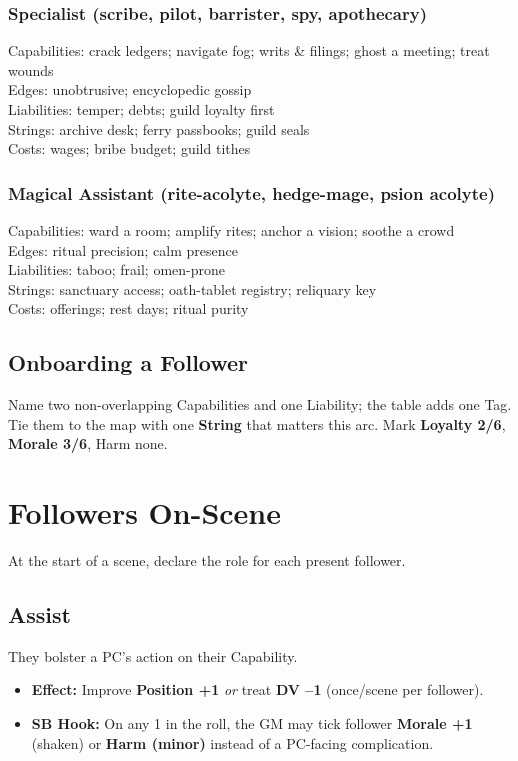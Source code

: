 \subsubsection*{Specialist (scribe, pilot, barrister, spy, apothecary)}
Capabilities: crack ledgers; navigate fog; writs \& filings; ghost a meeting; treat wounds\\
Edges: unobtrusive; encyclopedic gossip\\
Liabilities: temper; debts; guild loyalty first\\
Strings: archive desk; ferry passbooks; guild seals\\
Costs: wages; bribe budget; guild tithes

\subsubsection*{Magical Assistant (rite-acolyte, hedge-mage, psion acolyte)}
Capabilities: ward a room; amplify rites; anchor a vision; soothe a crowd\\
Edges: ritual precision; calm presence\\
Liabilities: taboo; frail; omen-prone\\
Strings: sanctuary access; oath-tablet registry; reliquary key\\
Costs: offerings; rest days; ritual purity

\subsection{Onboarding a Follower}
Name two non-overlapping Capabilities and one Liability; the table adds one Tag. Tie them to the map with one \textbf{String} that matters this arc. Mark \textbf{Loyalty 2/6}, \textbf{Morale 3/6}, Harm none.

\section{Followers On-Scene}
At the start of a scene, declare the role for each present follower.

\subsection{Assist}
They bolster a PC's action on their Capability.
\begin{itemize}
  \item \textbf{Effect:} Improve \textbf{Position +1} \emph{or} treat \textbf{DV --1} (once/scene per follower).
  \item \textbf{SB Hook:} On any 1 in the roll, the GM may tick follower \textbf{Morale +1} (shaken) or \textbf{Harm (minor)} instead of a PC-facing complication.
\end{itemize}

